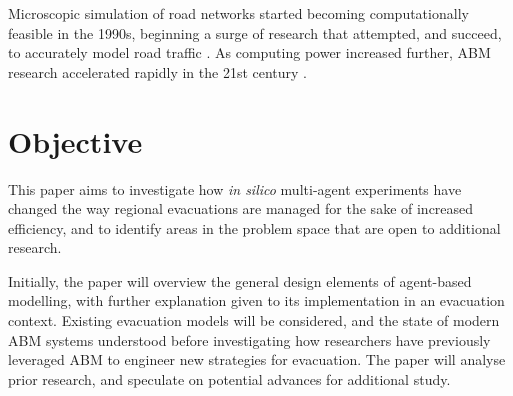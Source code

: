 Microscopic simulation of road networks started becoming computationally feasible in the 1990s, beginning a surge of research that attempted, and succeed, to accurately model road traffic \cite{Nagel1992ATraffic}. As computing power increased further, ABM research accelerated rapidly in the 21st century \cite{Bonabeau2002Agent-basedSystems.,Teodorovic2003TransportApproach}.

\section{Objective}
This paper aims to investigate how \textit{in silico} multi-agent experiments have changed the way regional evacuations are managed for the sake of increased efficiency, and to identify areas in the problem space that are open to additional research.

Initially, the paper will overview the general design elements of agent-based modelling, with further explanation given to its implementation in an evacuation context. Existing evacuation models will be considered, and the state of modern ABM systems understood before investigating how researchers have previously leveraged ABM to engineer new strategies for evacuation. The paper will analyse prior research, and speculate on potential advances for additional study.
